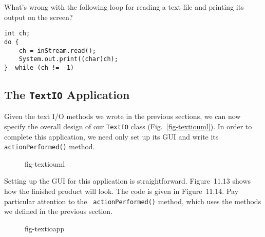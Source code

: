 \label{self-study-exercise}
\begin{SSTUDY}

\item  What's wrong with the following loop for reading
a text file and printing its output on the screen?

\begin{jjjlisting}
\begin{lstlisting}
int ch;
do {
    ch = inStream.read();
    System.out.print((char)ch);
}  while (ch != -1) 
\end{lstlisting}
\end{jjjlisting}
\end{SSTUDY}

\subsection{The {\tt TextIO} Application}
\noindent Given the text I/O methods we wrote in the previous sections, we can
now specify the overall design of our {\tt TextIO} class
(Fig.~\ref{fig-textiouml}).  In order to complete this application, we
need only set up its GUI and write its {\tt action\-Performed()} method.

\begin{figure}[h!]
 {fig-textiouml}
\end{figure}

\noindent Setting up the GUI for this application is straightforward.
Figure~11.13 shows how the finished product will look.  The code is
given in Figure~11.14. Pay particular attention to the {\tt
actionPerformed()} method, which uses the methods we defined in the
previous section.

\begin{figure}[h!]
 {fig-textioapp}
\end{figure}

